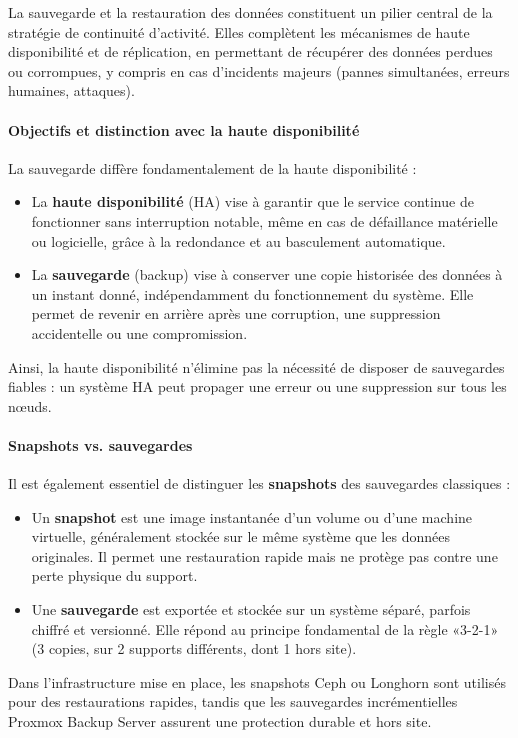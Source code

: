 La sauvegarde et la restauration des données constituent un pilier central de la stratégie de continuité d’activité. Elles complètent les mécanismes de haute disponibilité et de réplication, en permettant de récupérer des données perdues ou corrompues, y compris en cas d’incidents majeurs (pannes simultanées, erreurs humaines, attaques).

\paragraph{Objectifs et distinction avec la haute disponibilité}
La sauvegarde diffère fondamentalement de la haute disponibilité :
\begin{itemize}
	\item La \textbf{haute disponibilité} (HA) vise à garantir que le service continue de fonctionner sans interruption notable, même en cas de défaillance matérielle ou logicielle, grâce à la redondance et au basculement automatique.
	\item La \textbf{sauvegarde} (backup) vise à conserver une copie historisée des données à un instant donné, indépendamment du fonctionnement du système. Elle permet de revenir en arrière après une corruption, une suppression accidentelle ou une compromission.
\end{itemize}
Ainsi, la haute disponibilité n’élimine pas la nécessité de disposer de sauvegardes fiables : un système HA peut propager une erreur ou une suppression sur tous les nœuds.

\paragraph{Snapshots vs. sauvegardes}
Il est également essentiel de distinguer les \textbf{snapshots} des sauvegardes classiques :
\begin{itemize}
	\item Un \textbf{snapshot} est une image instantanée d’un volume ou d’une machine virtuelle, généralement stockée sur le même système que les données originales. Il permet une restauration rapide mais ne protège pas contre une perte physique du support.
	\item Une \textbf{sauvegarde} est exportée et stockée sur un système séparé, parfois chiffré et versionné. Elle répond au principe fondamental de la règle «3-2-1» (3 copies, sur 2 supports différents, dont 1 hors site).
\end{itemize}
Dans l’infrastructure mise en place, les snapshots Ceph ou Longhorn sont utilisés pour des restaurations rapides, tandis que les sauvegardes incrémentielles Proxmox Backup Server assurent une protection durable et hors site.


